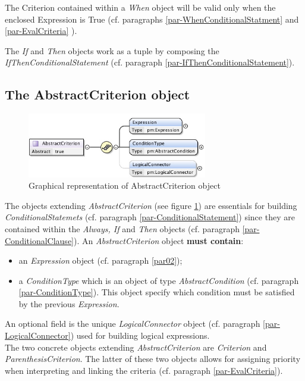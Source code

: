 \documentclass[a4paper,11pt] {ivoa}
\begin{document}
The Criterion contained within a {\it When} object will be valid only when the enclosed Expression
is True (cf. paragraphs \ref{par-WhenConditionalStatment} and \ref{par-EvalCriteria} ).

The {\it If} and {\it Then} objects work as a tuple by composing the  {\it
IfThenConditionalStatement} (cf. paragraph
\ref{par-IfThenConditionalStatement}).

\subsection{The AbstractCriterion object}\label{par-AbstractCriterion}
\begin{figure}[htbp]
\begin{center}
\includegraphics[width=0.7\textwidth]{pictures/AbstractCriterion.jpg} 
\caption{Graphical representation of AbstractCriterion object}
\label{Pic-AbstractCriterion}
\end{center}
\end{figure}
The objects extending {\it AbstractCriterion} (see figure \ref{Pic-AbstractCriterion}) are
essentials for building {\it ConditionalStatemets} (cf. paragraph \ref{par-ConditionalStatement})
since they are contained within the {\it Always, If} and {\it Then} objects (cf. paragraph
\ref{par-ConditionalClause}).
An {\it AbstractCriterion} object {\bf must contain}:
\begin{itemize}
\item an {\it Expression} object (cf. paragraph \ref{par02});
\item a {\it ConditionType} which is an object of type {\it AbstractCondition} (cf. paragraph 
\ref{par-ConditionType}).
This object specify which condition must be satisfied by the previous {\it Expression}.
\end{itemize}
An optional field is the unique {\it LogicalConnector} object (cf. paragraph
\ref{par-LogicalConnector}) used for building logical expressions.\\
The two concrete objects extending  {\it AbstractCriterion}  are {\it Criterion} and {\it
ParenthesisCriterion}.  The latter of these two objects allows for assigning priority when
interpreting and linking the criteria (cf. paragraph \ref{par-EvalCriteria}).
\end{document}
